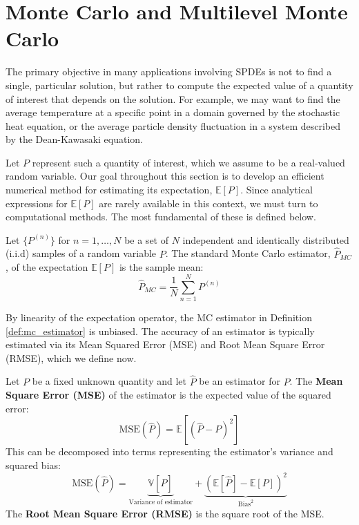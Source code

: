 \section{Monte Carlo and Multilevel Monte Carlo}\label{sec:intro_mlmc}

The primary objective in many applications involving SPDEs is not to find 
a single, particular solution, but rather to compute the expected value of a quantity of 
interest that depends on the solution. For example, we may 
want to find the average temperature at a specific point in a domain 
governed by the stochastic heat equation, or the average particle density fluctuation
in a system described by the Dean-Kawasaki equation.

Let $P$ represent such a quantity of interest, which we assume to be a real-valued 
random variable. Our goal throughout this section is to develop an efficient numerical
method for estimating its expectation, $\mathbb{E}[P]$. Since 
analytical expressions for $\mathbb{E}[P]$ are rarely available in this context, we must 
turn to computational methods. The most fundamental of these is defined below.

\begin{definition}\label{def:mc_estimator}
    Let $\{P^{(n)}\}$ for $n = 1, \dots, N$ be a set of $N$ independent and identically
    distributed (i.i.d) samples of a random variable $P$. The standard Monte Carlo estimator,
    $\hat{P}_{MC}$, of the expectation $\mathbb{E}[P]$ is the sample mean:
    \[
    \hat{P}_{MC} = \frac{1}{N} \sum_{n=1}^N P^{(n)}
    \]
\end{definition}

By linearity of the expectation operator, the MC estimator in Definition \ref{def:mc_estimator} 
is unbiased. The accuracy of an estimator is typically estimated via its Mean Squared Error (MSE) and 
Root Mean Square Error (RMSE), which we define now.

\begin{definition}\label{def:mse_rmse}
    Let $P$ be a fixed unknown quantity and let $\hat{P}$ be an estimator for $P$. 
    The \textbf{Mean Square Error (MSE)} of the estimator is the expected value of 
    the squared error:
    \[
    \text{MSE}(\hat{P}) = \mathbb{E}[(\hat{P} - P)^2]
    \]
    This can be decomposed into terms representing the estimator's variance and squared bias:
    \[
    \text{MSE}(\hat{P}) = \underbrace{\mathbb{V}[\hat{P}]}_{\text{Variance of estimator}}
    + \underbrace{(\mathbb{E}[\hat{P}] - \mathbb{E}[P])^2}_{\text{Bias}^2}
    \]
    The \textbf{Root Mean Square Error (RMSE)} is the square root of the MSE.
\end{definition}

